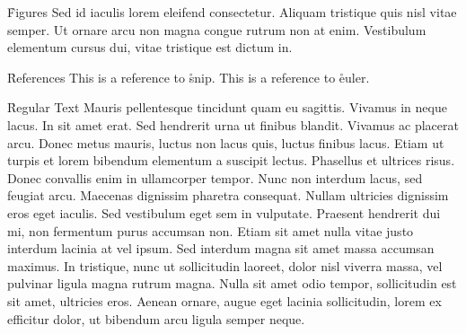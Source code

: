 \documentclass{paper}
\begin{document}
\h{Figures}
Sed id iaculis lorem eleifend consectetur. Aliquam tristique quis nisl vitae semper. Ut ornare arcu non magna congue rutrum non at enim. Vestibulum elementum cursus dui, vitae tristique est dictum in.


\h{References}
This is a reference to \r{snip}. This is a reference to \r{euler}.

\h{Regular Text}
Mauris pellentesque tincidunt quam eu sagittis. Vivamus in neque lacus. In sit amet erat. Sed hendrerit urna ut finibus blandit. Vivamus ac placerat arcu.  Donec metus mauris, luctus non lacus quis, luctus finibus lacus. Etiam ut turpis et lorem bibendum elementum a suscipit lectus. Phasellus et ultrices risus. Donec convallis enim in ullamcorper tempor. Nunc non interdum lacus, sed feugiat arcu. Maecenas dignissim pharetra consequat. Nullam ultricies dignissim eros eget iaculis. Sed vestibulum eget sem in vulputate. Praesent hendrerit dui mi, non fermentum purus accumsan non. Etiam sit amet nulla vitae justo interdum lacinia at vel ipsum. Sed interdum magna sit amet massa accumsan maximus. In tristique, nunc ut sollicitudin laoreet, dolor nisl viverra massa, vel pulvinar ligula magna rutrum magna. Nulla sit amet odio tempor, sollicitudin est sit amet, ultricies eros. Aenean ornare, augue eget lacinia sollicitudin, lorem ex efficitur dolor, ut bibendum arcu ligula semper neque.
\end{document}
